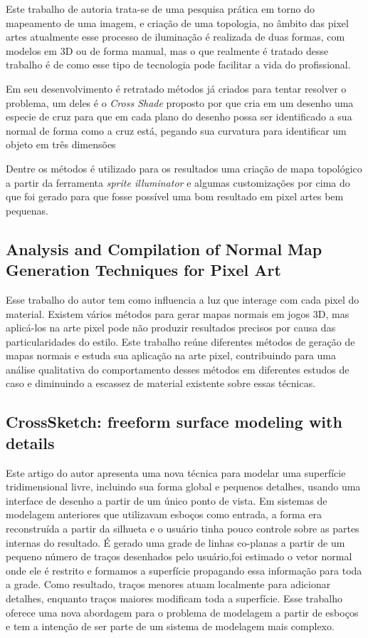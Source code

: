 Este trabalho de autoria  trata-se de uma pesquisa prática em torno do mapeamento de uma imagem, e criação de uma topologia, no âmbito das pixel artes atualmente esse processo de iluminação é realizada de duas formas, com modelos em 3D ou de forma manual, mas o que realmente é tratado desse trabalho é de como esse tipo de tecnologia pode facilitar a vida do profissional.

Em seu desenvolvimento é retratado métodos já criados para tentar resolver o problema, um deles é o \textit{Cross Shade} proposto por \cite{Shao2012} que cria em um desenho uma especie de cruz para que em cada plano do desenho possa ser identificado a sua normal de forma como a cruz está, pegando sua curvatura para identificar um objeto em três dimensões

Dentre os métodos é utilizado para os resultados uma criação de mapa topológico a partir da ferramenta \textit{sprite illuminator} e algumas customizações por cima do que foi gerado para que fosse possível uma bom resultado em pixel artes bem pequenas.

\subsection{Analysis and Compilation of Normal Map Generation Techniques for Pixel Art}

Esse trabalho do autor  tem como influencia a luz que interage com cada pixel do material. Existem vários métodos para gerar mapas normais em jogos 3D, mas aplicá-los na arte pixel pode não produzir resultados precisos por causa das particularidades do estilo. Este trabalho reúne diferentes métodos de geração de mapas normais e estuda sua aplicação na arte pixel, contribuindo para uma análise qualitativa do comportamento desses métodos em diferentes estudos de caso e diminuindo a escassez de material existente sobre essas técnicas.

\subsection{CrossSketch: freeform surface modeling with details}

Este artigo do autor  apresenta uma nova técnica para modelar uma superfície tridimensional livre, incluindo sua forma global e pequenos detalhes, usando uma interface de desenho a partir de um único ponto de vista. Em sistemas de modelagem anteriores que utilizavam esboços como entrada, a forma era reconstruída a partir da silhueta e o usuário tinha pouco controle sobre as partes internas do resultado. É gerado uma grade de linhas co-planas a partir de um pequeno número de traços desenhados pelo usuário,foi estimado o vetor normal onde ele é restrito e formamos a superfície propagando essa informação para toda a grade. Como resultado, traços menores atuam localmente para adicionar detalhes, enquanto traços maiores modificam toda a superfície. Esse trabalho oferece uma nova abordagem para o problema de modelagem a partir de esboços e tem a intenção de ser parte de um sistema de modelagem mais complexo.
